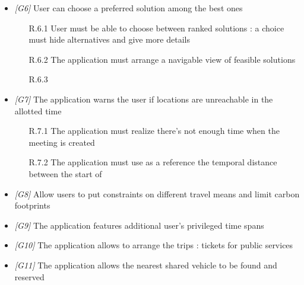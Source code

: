 \begin{itemize}
\begin{itemize}
                  \end{itemize}
                  
\item \textit{[G6]} User can choose a preferred solution among the best ones 

                   \begin{itemize}
                        \item [R.6.1] User must be able to choose between ranked solutions : a choice must hide alternatives and give more details
                        \item [R.6.2] The application must arrange a navigable view of feasible solutions
                        \item [R.6.3] 
                  \end{itemize}
                  
\item \textit{[G7]} The application warns the user if locations are unreachable in the allotted time

                   \begin{itemize}
                        \item[R.7.1] The application must realize there's not enough time when the meeting is created
                        \item [R.7.2] The application must use as a reference the temporal distance between the start of                        
                   
                   \end{itemize}

\item \textit{[G8]} Allow users to put constraints on different travel means and limit carbon footprints

\item \textit{[G9]} The application features additional user’s privileged time spans 

\item \textit{[G10]} The application allows to arrange the trips : tickets for public services

\item \textit{[G11]} The application allows the nearest shared vehicle to be found and reserved


\end{itemize}

